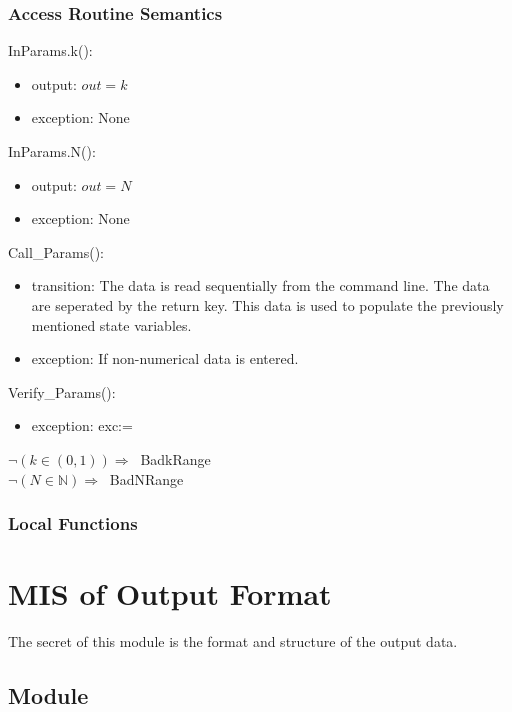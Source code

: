 \documentclass[12pt, titlepage]{article}
\begin{document}
\subsubsection{Access Routine Semantics}

\noindent InParams.k():
\begin{itemize}
\item output: $out = k$
\item exception: None
\end{itemize}

\noindent InParams.N():
\begin{itemize}
	\item output: $out = N$
	\item exception: None
\end{itemize}

\noindent Call\_Params():
\begin{itemize}
	\item transition: The data is read sequentially from the command line. The 
	data are seperated by the return key. This data is used to populate the 
	previously mentioned state variables. 
	\item exception: If non-numerical data is entered. 
\end{itemize} 

\noindent Verify\_Params():
\begin{itemize}
	\item exception: exc:=
\end{itemize}  

\noindent $\neg (k \in (0,1)) \Rightarrow \ $ BadkRange\\
$\neg (N \in \mathbb{N}) \Rightarrow \ $ BadNRange

\subsubsection{Local Functions}
\newpage

\section{MIS of Output Format} 

The secret of this module is the format and structure of the output data.

\subsection{Module}
\end{document}
